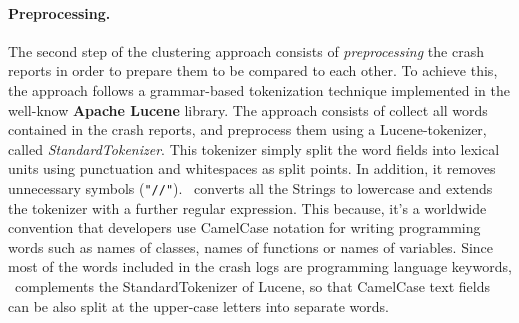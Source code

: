 \paragraph{Preprocessing.}
The second step of the clustering approach consists of \textit{preprocessing} the crash reports in order to prepare them to be compared to each other. 
To achieve this, the approach follows a grammar-based tokenization technique implemented in the well-know \textbf{Apache Lucene} \cite{lucene} library.  
The approach consists of collect all words contained in the crash reports, and preprocess them using a Lucene-tokenizer, called \textit{StandardTokenizer}. 
This tokenizer simply split the word fields into lexical units using punctuation and whitespaces as split points. In addition, it removes unnecessary symbols (\eg \texttt{"//"}).
\toolname\ converts all the Strings to lowercase and extends the tokenizer with a further regular expression. 
This because, it's a worldwide convention that developers use CamelCase notation for writing programming words such as names of classes, names of functions or names of variables.
Since most of the words included in the crash logs are programming language keywords, \toolname\ complements the StandardTokenizer of Lucene, so that CamelCase text fields can be also split at the upper-case letters into separate words. 

